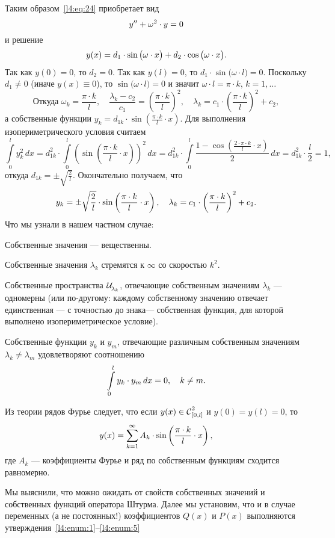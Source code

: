 \documentclass[12pt,a4paper,openany,fleqn]{book}
\newcommand{\Cf}{\ensuremath{\mathcal{C}}}
\newcommand{\mc}[1]{\ensuremath{\mathcal{#1}}}
\newcommand{\Cfn}[2][]{\ensuremath{\Cf{\mathstrut}^{#2}_{#1}}}
\newcommand{\Ul}[1][\lambda]{\ensuremath{\mc{U}\!{\mathstrut}_{#1}}}
\theoremstyle{definition}
\begin{document}
Таким образом~\eqref{l4:eq:24} приобретает вид
\begin{equation*}
	\hfill y''+\omega^2\cdot y=0\hfill
\end{equation*}  
и решение
\begin{equation*}
	\hfill y(x)=d_1\cdot\sin\big(\omega\cdot x\big)+d_2\cdot\cos\big(\omega\cdot x\big).\hfill
\end{equation*}
Так как $y(0)=0$, то $d_2=0$. Так как $y(l)=0$, то $d_1\cdot\sin\big(\omega\cdot l\big)=0$. Поскольку $d_1\neq0$ (иначе $y(x)\equiv0$), то $\sin\big(\omega\cdot l\big)=0$ и значит $\omega\cdot l=\pi\cdot k$, $k=1,\ldots$ 
\begin{equation*}
	\text{Откуда }\omega_k=\frac{\pi\cdot k}{l},\quad \frac{\lambda_k-c_2}{c_1}=\left(\frac{\pi\cdot k}{l}\right)^2,\quad\lambda_k=c_1\cdot\left(\frac{\pi\cdot k}{l}\right)^2+c_2,
\end{equation*}
а собственные функции $y_k=d_{1k}\cdot\sin\left(\frac{\pi\cdot k}{l}\cdot x\right)$. Для выполнения изопериметрического условия считаем
\begin{equation*}
	\int\limits_0^l y_k^2\,dx=d_{1k}^2\cdot\int\limits_0^l\left(\sin\left(\frac{\pi\cdot k}{l}\cdot x\right)\right)^2\,dx=d_{1k}^2\cdot\int\limits_0^l\frac{1-\cos\left(\frac{2\cdot\pi\cdot k}{l}\cdot x\right)}{2}\,dx=d_{1k}^2\cdot\frac{l}{2}=1,
\end{equation*}
откуда $d_{1k}=\pm\displaystyle\sqrt{\frac{2}{l}}$. Окончательно получаем, что
\begin{equation*}
	\hfill y_k=\pm\sqrt{\frac{2}{l}}\cdot\sin\left(\frac{\pi\cdot k}{l}\cdot x\right),\quad\lambda_k=c_1\cdot\left(\frac{\pi\cdot k}{l}\right)^2+c_2.\hfill
\end{equation*}
Что мы узнали в нашем частном случае:
\begin{enumerateD}
	\item\label{l4:enum:1} Собственные значения --- вещественны.
	\item Собственные значения $\lambda_k$ стремятся к $\infty$ со скоростью $k^2$.
	\item Собственные пространства $\displaystyle \Ul[\lambda_k]$, отвечающие собственным значениям $\lambda_k$ --- одномерны (или по-другому: каждому собственному значению отвечает единственная --- с точностью до знака--- собственная функция, для которой выполнено изопериметрическое условие).
	\item Собственные функции $y_k$ и $y_m$, отвечающие различным собственным значениям $\lambda_k\neq\lambda_m$ удовлетворяют соотношению
	\begin{equation*}
		\hfill\int\limits_0^l y_k\cdot y_m\,dx=0,\quad k\neq m.\hfill
	\end{equation*}
	\item\label{l4:enum:5} Из теории рядов Фурье следует, что если $y(x)\in\Cfn[{[0,l]}]{2}$ и $y(0)=y(l)=0$, то 
	\begin{equation*}
		\hfill y(x)=\sum\limits_{k=1}^{\infty} A_k\cdot\sin\left(\frac{\pi\cdot k}{l}\cdot x\right),\hfill
	\end{equation*}
	где $A_k$ --- коэффициенты Фурье и ряд по собственным функциям сходится равномерно. 
\end{enumerateD}

Мы выяснили, что можно ожидать от свойств собственных значений и собственных функций оператора Штурма. Далее мы установим, что и в случае переменных (а не постоянных!) коэффициентов $Q(x)$ и $P(x)$ выполняются утверждения~\ref{l4:enum:1}--\ref{l4:enum:5}
\end{document}
